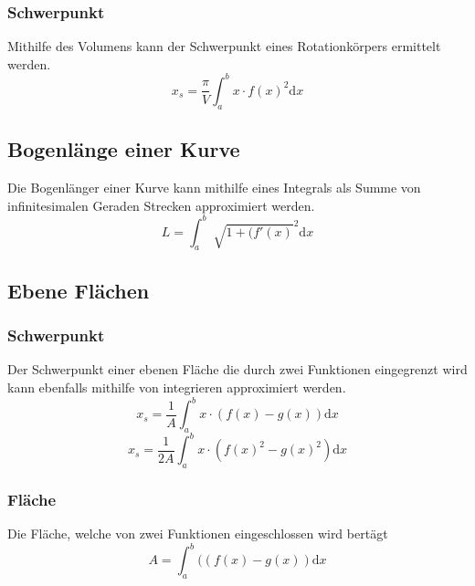 \documentclass{article}
\begin{document}
\subsubsection{Schwerpunkt}
Mithilfe des Volumens kann der Schwerpunkt eines Rotationkörpers ermittelt werden.
$$x_s = \frac{\pi}{V} \int_{a}^{b} x \cdot f(x)^{2} \mathrm{d}x $$
\subsection{Bogenlänge einer Kurve}
Die Bogenlänger einer Kurve kann mithilfe eines Integrals als Summe von infinitesimalen Geraden Strecken approximiert werden.
$$L = \int_{a}^{b} \sqrt[]{1+(f'(x)}^{2} \mathrm{d}x $$
\subsection{Ebene Flächen}
\subsubsection{Schwerpunkt}
Der Schwerpunkt einer ebenen Fläche die durch zwei Funktionen eingegrenzt wird kann ebenfalls mithilfe von integrieren approximiert werden.
$$x_s = \frac{1}{A} \int_{a}^{b} x \cdot (f(x)-g(x)) \mathrm{d}x $$
$$x_s = \frac{1}{2A} \int_{a}^{b} x \cdot (f(x)^{2}-g(x)^{2}) \mathrm{d}x $$
\subsubsection{Fläche}
Die Fläche, welche von zwei Funktionen eingeschlossen wird bertägt
$$A = \int_{a}^{b} ((f(x)-g(x)) \mathrm{d}x $$
\end{document}
